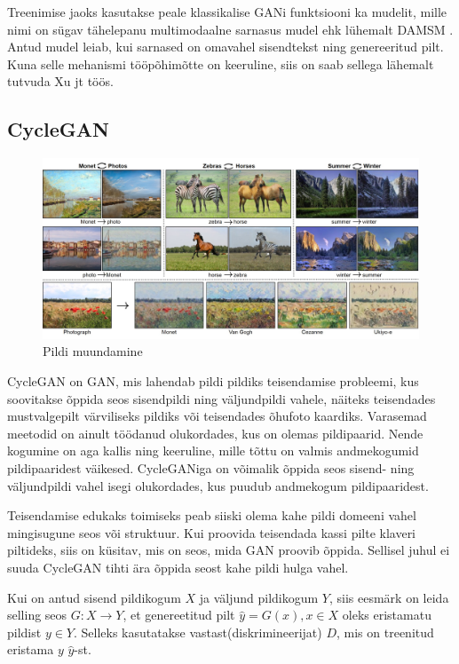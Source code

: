 \documentclass{vilgym}
\begin{document}
	Treenimise jaoks kasutakse peale klassikalise GANi funktsiooni ka mudelit, mille nimi on sügav tähelepanu multimodaalne sarnasus mudel ehk lühemalt DAMSM . Antud mudel leiab, kui sarnased on omavahel sisendtekst ning genereeritud pilt. Kuna selle mehanismi tööpõhimõtte on keeruline, siis on saab sellega lähemalt tutvuda Xu jt töös.

	\subsection{CycleGAN}
	\begin{figure}
		\centering
			\includegraphics[width=\linewidth]{images/cyclegan.jpg}
			\caption{Pildi muundamine}
			\label{fig:cyclegan}
	\end{figure}


	CycleGAN on GAN, mis lahendab pildi pildiks teisendamise probleemi, kus soovitakse õppida seos sisendpildi ning väljundpildi vahele, näiteks teisendades mustvalgepilt värviliseks pildiks või teisendades õhufoto kaardiks. Varasemad meetodid on ainult töödanud olukordades, kus on olemas pildipaarid. Nende kogumine on aga kallis ning keeruline, mille tõttu on valmis andmekogumid pildipaaridest väikesed. CycleGANiga on võimalik õppida seos sisend- ning väljundpildi vahel isegi olukordades, kus puudub andmekogum pildipaaridest. 

	Teisendamise edukaks toimiseks peab siiski olema kahe pildi domeeni vahel mingisugune seos või struktuur. Kui proovida teisendada kassi pilte klaveri piltideks, siis on küsitav, mis on seos, mida GAN proovib õppida. Sellisel juhul ei suuda CycleGAN tihti ära õppida seost kahe pildi hulga vahel.

	Kui on antud sisend pildikogum $ X $ ja väljund pildikogum $ Y $, siis eesmärk on leida selling seos $ G: X \rightarrow Y $, et genereetitud pilt $ \hat{y} = G(x), x \in X $ oleks eristamatu pildist $ y \in Y $. Selleks kasutatakse vastast(diskrimineerijat) $ D $, mis on treenitud eristama $ y $ $ \hat{y} $-st. 
\end{document}
